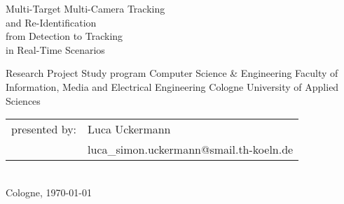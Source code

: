 \begin{titlepage}

	\begin{center}
	\end{center}

	\vspace*{10mm}

	\begin{huge}
		\noindent
		Multi-Target Multi-Camera Tracking\\and Re-Identification\\[5mm]from Detection to Tracking\\in Real-Time Scenarios\\[10mm]
	\end{huge}

	Research Project\newline
	Study program Computer Science \& Engineering\newline
	Faculty of Information, Media and Electrical Engineering\newline
	Cologne University of Applied Sciences\\[10mm]

	\begin{tabular}{@{}ll}
		presented by: & Luca Uckermann                          \\
		              & luca\_simon.uckermann@smail.th-koeln.de \\
	\end{tabular}
	\\[20mm]

	Cologne, \today

\end{titlepage}